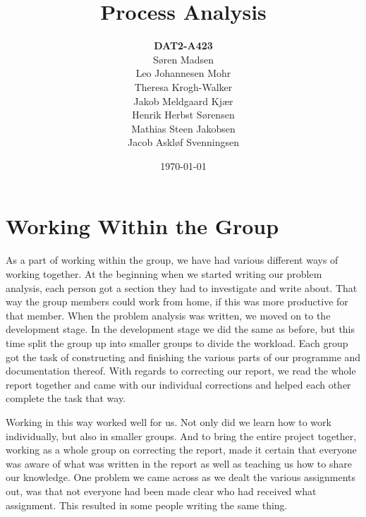 

\title{Process Analysis}
\author{\textbf{DAT2-A423}\\  
    Søren Madsen\\
    Leo Johannesen Mohr\\
    Theresa Krogh-Walker\\
    Jakob Meldgaard Kjær\\
    Henrik Herbst Sørensen\\
    Mathias Steen Jakobsen\\ 
    Jacob Askløf Svenningsen}
\date{\today}
\maketitle 
\section{Working Within the Group}
As a part of working within the group, we have had various different ways of working together. 
At the beginning when we started writing our problem analysis, each person got a section they had to investigate and write about. 
That way the group members could work from home, if this was more productive for that member.
When the problem analysis was written, we moved on to the development stage. 
In the development stage we did the same as before, but this time split the group up into smaller groups to divide the workload. 
Each group got the task of constructing and finishing the various parts of our programme and documentation thereof. 
With regards to correcting our report, we read the whole report together and came with our individual corrections and helped each other complete the task that way.

Working in this way worked well for us.
Not only did we learn how to work individually, but also in smaller groups. 
And to bring the entire project together, working as a whole group on correcting the report, made it certain that everyone was aware of what was written in the report as well as teaching us how to share our knowledge. 
One problem we came across as we dealt the various assignments out, was that not everyone had been made clear who had received what assignment.
This resulted in some people writing the same thing.

